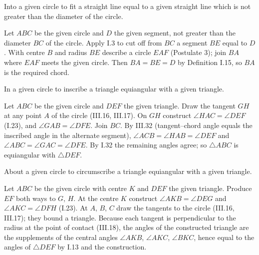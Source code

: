 \documentclass{rrxiv}
\begin{document}
\begin{claim}
\label{prop:IV.1}
Into a given circle to fit a straight line equal to a given straight
line which is not greater than the diameter of the circle.
\end{claim}
\begin{evidence}[Proof of IV.1]
\label{ev:IV.1}
Let $ABC$ be the given circle and $D$ the given segment, not greater
than the diameter $BC$ of the circle.  Apply I.3 to cut off from $BC$
a segment $BE$ equal to $D$.  With centre $B$ and radius $BE$ describe
a circle $EAF$ (Postulate 3); join $BA$ where $EAF$ meets the given
circle.  Then $BA = BE = D$ by Definition I.15, so $BA$ is the required
chord.
\end{evidence}

\begin{claim}
\label{prop:IV.2}
In a given circle to inscribe a triangle equiangular with a given
triangle.
\end{claim}
\begin{evidence}[Proof of IV.2]
\label{ev:IV.2}
Let $ABC$ be the given circle and $DEF$ the given triangle.  Draw the
tangent $GH$ at any point $A$ of the circle (III.16, III.17).  On $GH$
construct $\angle HAC = \angle DEF$ (I.23), and $\angle GAB = \angle
DFE$.  Join $BC$.  By III.32 (tangent--chord angle equals the
inscribed angle in the alternate segment), $\angle ACB = \angle HAB
= \angle DEF$ and $\angle ABC = \angle GAC = \angle DFE$.  By I.32 the
remaining angles agree; so $\triangle ABC$ is equiangular with
$\triangle DEF$.
\end{evidence}

\begin{claim}
\label{prop:IV.3}
About a given circle to circumscribe a triangle equiangular with a
given triangle.
\end{claim}
\begin{evidence}[Proof of IV.3]
\label{ev:IV.3}
Let $ABC$ be the given circle with centre $K$ and $DEF$ the given
triangle.  Produce $EF$ both ways to $G$, $H$.  At the centre $K$
construct $\angle AKB = \angle DEG$ and $\angle AKC = \angle DFH$
(I.23).  At $A$, $B$, $C$ draw the tangents to the circle (III.16,
III.17); they bound a triangle.  Because each tangent is perpendicular
to the radius at the point of contact (III.18), the angles of the
constructed triangle are the supplements of the central angles $\angle
AKB$, $\angle AKC$, $\angle BKC$, hence equal to the angles of
$\triangle DEF$ by I.13 and the construction.
\end{evidence}
\end{document}
